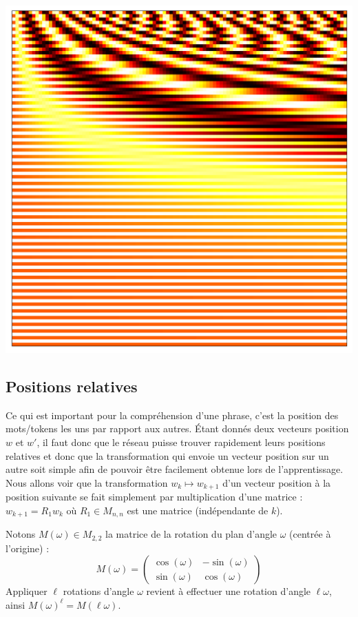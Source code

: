 \documentclass[11pt,class=report,crop=false]{standalone}
\begin{document}
\begin{center}
	\includegraphics[scale=\myscale,scale=0.4]{figures/position-matrix}
\end{center}


\subsection{Positions relatives}

Ce qui est important pour la compréhension d'une phrase, c'est la position des mots/tokens les uns par rapport aux autres. Étant donnés deux vecteurs position $w$ et $w'$, il faut donc que le réseau puisse trouver rapidement leurs positions relatives et donc que la transformation qui envoie un vecteur position sur un autre soit simple afin de pouvoir être facilement obtenue lors de l'apprentissage.
Nous allons voir que la transformation $w_k \mapsto w_{k+1}$ d'un vecteur position à la position suivante se fait simplement par multiplication d'une matrice :
$w_{k+1} = R_1 w_k$ où $R_1 \in M_{n,n}$ est une matrice (indépendante de $k$).

Notons $M(\omega) \in M_{2,2}$ la matrice de la rotation du plan d'angle $\omega$ (centrée à l'origine) :
\[
M(\omega) = 
\begin{pmatrix}
	\cos(\omega) & -\sin(\omega) \\
	\sin(\omega) & \cos(\omega)
\end{pmatrix}
\]	
Appliquer $\ell$ rotations d'angle $\omega$ revient à effectuer une rotation d'angle $\ell\omega$, ainsi $M(\omega)^\ell = M(\ell\omega)$.
\end{document}

